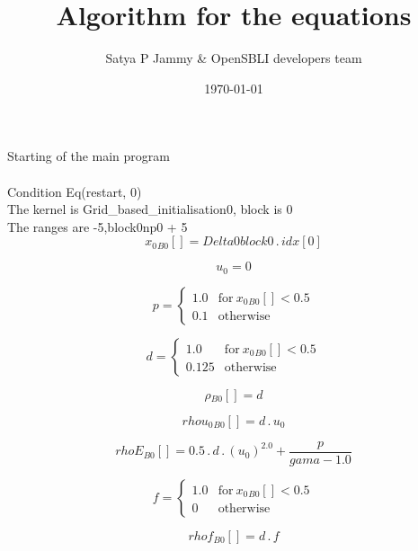 \documentclass{article}
\title{Algorithm for the equations}
\author{Satya P Jammy \& OpenSBLI developers team}
\date{\today}
\begin{document}
\maketitle
\noindent Starting of the main program\\
\\\noindent Condition Eq(restart, 0)\\\noindent The kernel is Grid_based_initialisation0, block is 0\\\noindent The ranges are -5,block0np0 + 5\\\begin{dmath}{x_{0}{_{B0}}}[{}] = Delta0block0 \,.\, {idx}[{0}]\end{dmath}

\begin{dmath}u_{0} = 0\end{dmath}

\begin{dmath}p = \begin{cases} 1.0 & \text{for}\: {x_{0}{_{B0}}}[{}] < 0.5 \\0.1 & \text{otherwise} \end{cases}\end{dmath}

\begin{dmath}d = \begin{cases} 1.0 & \text{for}\: {x_{0}{_{B0}}}[{}] < 0.5 \\0.125 & \text{otherwise} \end{cases}\end{dmath}

\begin{dmath}{\rho{_{B0}}}[{}] = d\end{dmath}

\begin{dmath}{rhou_{0}{_{B0}}}[{}] = d \,.\, u_{0}\end{dmath}

\begin{dmath}{rhoE{_{B0}}}[{}] = 0.5 \,.\, d \,.\, \left(u_{0} \right)^{2.0} + \frac{p}{gama - 1.0}\end{dmath}

\begin{dmath}f = \begin{cases} 1.0 & \text{for}\: {x_{0}{_{B0}}}[{}] < 0.5 \\0 & \text{otherwise} \end{cases}\end{dmath}

\begin{dmath}{rhof{_{B0}}}[{}] = d \,.\, f\end{dmath}
\end{document}
